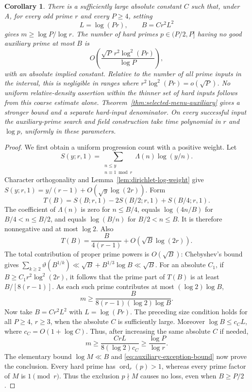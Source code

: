 \documentclass[11pt]{article}
\newtheorem{corollary}[theorem]{Corollary}
\theoremstyle{definition}
\theoremstyle{remark}
\begin{document}
\begin{corollary}\label{cor:uniform-r-almost-all-auxiliary}
There is a sufficiently large absolute constant $C$ such that,
under A, for every odd prime $r$ and every $P\ge4$, setting
\[
 L=\log(Pr),\qquad B=C r^2L^2
\]
gives $m\ge\log P/\log r$.  The number of hard primes
$p\in(P/2,P]$ having no good auxiliary prime at most $B$ is
\[
 O\!\left(\frac{\sqrt P\,r^2\log^2(Pr)}{\log P}\right),
\]
with an absolute implied constant.  Relative to the number of all
prime inputs in the interval, this is negligible in ranges where
$r^2\log^2(Pr)=o(\sqrt P)$.  No uniform relative-density
assertion within the thinner set of hard inputs follows from this
coarse estimate alone. Theorem~\ref{thm:selected-menu-auxiliary}
gives a stronger bound and a separate hard-input denominator.
On every successful input the auxiliary-prime search and field
construction take time polynomial in $r$ and $\log p$, uniformly
in these parameters.
\end{corollary}

\begin{proof}
We first obtain a uniform progression count with a positive weight.
Let
\[
 S(y;r,1)=\sum_{\substack{n\le y\\n\equiv1\bmod r}}
                 \Lambda(n)\log(y/n).
\]
Character orthogonality and Lemma~\ref{lem:dirichlet-log-weight}
give $S(y;r,1)=y/(r-1)+O(\sqrt y\log(2r))$.
Form
\[
 T(B)=S(B;r,1)-2S(B/2;r,1)+S(B/4;r,1).
\]
The coefficient of $\Lambda(n)$ is zero for $n\le B/4$, equals
$\log(4n/B)$ for $B/4<n\le B/2$, and equals $\log(B/n)$
for $B/2<n\le B$.  It is therefore nonnegative and at most
$\log2$.  Also
\[
 T(B)=\frac{B}{4(r-1)}+O(\sqrt B\log(2r)).
\]
The total contribution of proper prime powers is $O(\sqrt B)$:
Chebyshev's bound gives
$\sum_{k\ge2}\vartheta(B^{1/k})\ll
\sqrt B+B^{1/3}\log B\ll\sqrt B$.
For an absolute $C_1$, if $B\ge C_1r^2\log^2(2r)$, it follows
that the prime part of $T(B)$ is at least $B/[8(r-1)]$.
As each such prime contributes at most $(\log2)\log B$,
\[
 m\ge\frac{B}{8(r-1)(\log2)\log B}.
\]
Now take $B=C r^2L^2$ with $L=\log(Pr)$.
The preceding size condition holds for all $P\ge4$, $r\ge3$,
when the absolute $C$ is sufficiently large.
Moreover $\log B\le c_C L$, where $c_C=O(1+\log C)$.
Thus, after increasing the same absolute $C$ if needed,
\[
 m\ge\frac{C rL}{8(\log2)c_C}
       \ge\frac{\log P}{\log r}.
\]
The elementary bound $\log M\ll B$ and
\eqref{eq:auxiliary-exception-bound} now prove the conclusion.
Every hard prime has $\operatorname{ord}_r(p)>1$, whereas every
prime factor of $M$ is $1\pmod r$.  Thus the exclusion $p\nmid M$
causes no loss, even when $B\ge P/2$.
\end{proof}
\end{document}
